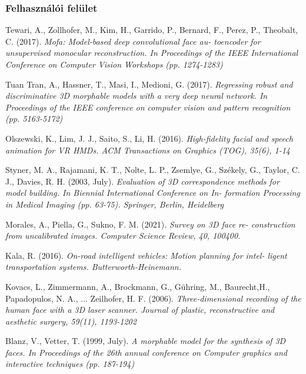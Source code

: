 \documentclass[12pt,a4]{article}
\begin{document}
    \subsubsection{Felhasználói felület}
	

	\newpage
	\renewcommand{\refname}{Hivatkozások}
	\begin{thebibliography}{9}
		
		Tewari, A., Zollhofer, M., Kim, H., Garrido, P., Bernard, F., Perez,
		P., Theobalt, C. (2017).
		\textit{Mofa: Model-based deep convolutional face au-
		toencoder for unsupervised monocular reconstruction. In Proceedings of
		the IEEE International Conference on Computer Vision Workshops (pp.
		1274-1283)}
		
		Tuan Tran, A., Hassner, T., Masi, I., Medioni, G. (2017). 
		\textit{Regressing
		robust and discriminative 3D morphable models with a very deep neural
		network. In Proceedings of the IEEE conference on computer vision and
		pattern recognition (pp. 5163-5172)}
		
		Olszewski, K., Lim, J. J., Saito, S., Li, H. (2016).
		\textit{High-fidelity facial and
		speech animation for VR HMDs. ACM Transactions on Graphics (TOG),
		35(6), 1-14}
		
		Styner, M. A., Rajamani, K. T., Nolte, L. P., Zsemlye, G., Székely, G.,
		Taylor, C. J., Davies, R. H. (2003, July).
		\textit{ Evaluation of 3D correspondence
		methods for model building. In Biennial International Conference on In-
		formation Processing in Medical Imaging (pp. 63-75). Springer, Berlin,
		Heidelberg}
		
		Morales, A., Piella, G., Sukno, F. M. (2021). 
		\textit{Survey on 3D face re-
		construction from uncalibrated images. Computer Science Review, 40,
		100400.}
		
		Kala, R. (2016).
		\textit{On-road intelligent vehicles: Motion planning for intel-
		ligent transportation systems. Butterworth-Heinemann.}	
		
		Kovacs, L., Zimmermann, A., Brockmann, G., Gühring, M., Baurecht,H., Papadopulos, N. A., ... Zeilhofer, H. F. (2006).
		\textit{Three-dimensional
		recording of the human face with a 3D laser scanner. Journal of plastic,
		reconstructive and aesthetic surgery, 59(11), 1193-1202}
		
		Blanz, V., Vetter, T. (1999, July).
		\textit{A morphable model for the synthesis
		of 3D faces. In Proceedings of the 26th annual conference on Computer
		graphics and interactive techniques (pp. 187-194)}
		

\end{thebibliography}
\end{document}
